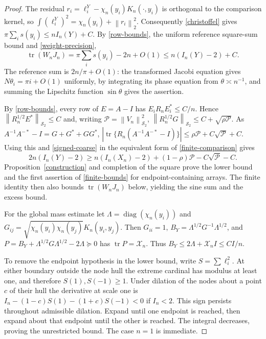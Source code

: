 \documentclass[a4paper,11pt]{amsart}
\theoremstyle{remark}\newtheorem{remark}[theorem]{Remark}
\newcommand{\tr}{\operatorname{tr}}
\newcommand{\diag}{\operatorname{diag}}
\newcommand{\HS}{\mathcal S_2}
\newcommand{\norm}[1]{\left\lVert#1\right\rVert}
\begin{document}
\begin{proof}
The residual $r_i=\ell_i^Y-\chi_n(y_i)K_n(\cdot,y_i)$ is orthogonal
to the comparison kernel, so
$\int(\ell_i^Y)^2=\chi_n(y_i)+\norm{r_i}_2^2$.
Consequently \eqref{christoffel} gives
$\pi\sum_i s(y_i)\le nI_n(Y)+C$.
By \eqref{row-bounds}, the uniform reference square-sum bound and
\eqref{weight-precision},
\begin{equation}\label{signed-coarse}
 \tr(W_nJ_n)=\pi\sum_i s(y_i)-2n+O(1)
 \le n(I_n(Y)-2)+C.
\end{equation}
The reference sum is $2n/\pi+O(1)$: the transformed Jacobi equation
gives $N\theta_i=\pi i+O(1)$ uniformly, by integrating its phase
equation from $\theta\asymp n^{-1}$, and summing the Lipschitz
function $\sin\theta$ gives the assertion.

By \eqref{row-bounds}, every row of $E=A-I$ has
$E_iR_nE_i^*\le C/n$. Hence
$\norm{R_n^{1/2}E^*}_{\HS}\le C$ and, writing
$\mathcal P=\norm{V_n}_{\HS}^2$,
$\norm{R_n^{1/2}G}_{\HS}\le C+\sqrt{\rho\mathcal P}$.
As $A^{-1}A^{-*}-I=G+G^*+GG^*$,
$|\tr\{R_n(A^{-1}A^{-*}-I)\}|
 \le\rho\mathcal P+C\sqrt{\mathcal P}+C$.
Using this and \eqref{signed-coarse} in the equivalent form of
\eqref{finite-comparison} gives
\begin{equation}\label{coercive-form}
 2n(I_n(Y)-2)\ge n(I_n(X_n)-2)
 +(1-\rho)\mathcal P-C\sqrt{\mathcal P}-C.
\end{equation}
Proposition~\ref{construction} and completion of the square prove
the lower bound and the first assertion of \eqref{finite-bounds}
for endpoint-containing arrays. The finite identity then also bounds
$\tr(W_nJ_n)$ below, yielding the sine sum and the excess bound.

For the global mass estimate let $\Lambda=\diag(\chi_n(y_i))$ and
$G_{ij}=\sqrt{\chi_n(y_i)\chi_n(y_j)}K_n(y_i,y_j)$.
Then $G_{ii}=1$, $B_Y=\Lambda^{1/2}G^{-1}\Lambda^{1/2}$, and
$P=B_Y+\Lambda^{1/2}G\Lambda^{1/2}-2\Lambda\succeq0$ has
$\tr P=\mathscr X_n$. Thus $B_Y\le2\Lambda+\mathscr X_nI\le CI/n$.

To remove the endpoint hypothesis in the lower bound, write
$S=\sum\ell_i^2$. At either boundary outside the node hull the
extreme cardinal has modulus at least one, and therefore
$S(1),S(-1)\ge1$. Under dilation of the nodes about a point $c$
of their hull the derivative at scale one is
$I_n-(1-c)S(1)-(1+c)S(-1)<0$ if $I_n<2$.
This sign persists throughout admissible dilation. Expand until one
endpoint is reached, then expand about that endpoint until the other
is reached. The integral decreases, proving the unrestricted bound.
The case $n=1$ is immediate.
\end{proof}
\end{document}
